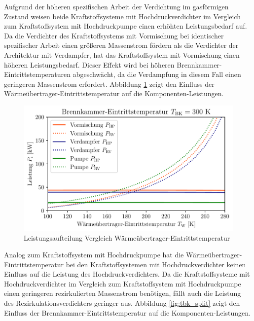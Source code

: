 Aufgrund der höheren spezifischen Arbeit der Verdichtung im gasförmigen Zustand weisen beide Kraftstoffsysteme mit Hochdruckverdichter im Vergleich zum Kraftstoffsystem mit Hochdruckpumpe einen erhöhten Leistungsbedarf auf. Da die Verdichter des Kraftstoffsystems mit Vormischung bei identischer spezifischer Arbeit einen größeren Massenstrom  fördern als die Verdichter der Architektur mit Verdampfer, hat das Kraftstoffsystem mit Vormischung einen höheren Leistungsbedarf. Dieser Effekt wird bei höheren Brennkammer-Eintrittstemperaturen abgeschwächt, da die Verdampfung in diesem Fall einen geringeren Massenstrom erfordert. Abbildung \ref{fig:comp_split} zeigt den Einfluss der Wärmeübertrager-Eintrittstemperatur auf die Komponenten-Leistungen.

\begin{figure}[ht]
\centering
\includegraphics[width=0.9\linewidth]{4_Abbildungen/2_Hauptteil/Ergebnisse/300summary_powersplit.pdf}
  \caption{Leistungsaufteilung Vergleich Wärmeübertrager-Eintrittstemperatur}
  \label{fig:comp_split}
\end{figure}
\FloatBarrier

Analog zum Kraftstoffsystem mit Hochdruckpumpe hat die Wärmeübertrager-Eintrittstemperatur bei den Kraftstoffsystemen mit Hochdruckverdichter keinen Einfluss auf die Leistung des Hochdruckverdichters. Da die Kraftstoffsysteme mit Hochdruckverdichter im Vergleich zum Kraftstoffsystem mit Hochdruckpumpe einen geringeren rezirkulierten Massenstrom benötigen, fällt auch die Leistung des Rezirkulationsverdichters geringer aus. Abbildung \ref{fig:tbk_split} zeigt den Einfluss der Brennkammer-Eintrittstemperatur auf die Komponenten-Leistungen.

